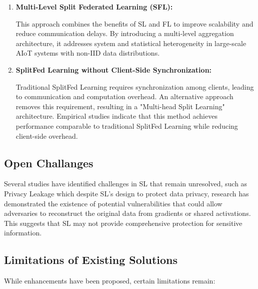 \begin{enumerate}

	\item \textbf{Multi-Level Split Federated Learning (\gls{SFL}):} 
	
	This approach combines the benefits of \gls{SL} and \gls{FL} to improve scalability and reduce communication delays. By introducing a multi-level aggregation architecture, it addresses system and statistical heterogeneity in large-scale AIoT systems with non-IID data distributions.
	
	\item \textbf{SplitFed Learning without Client-Side Synchronization:}
	 
	Traditional SplitFed Learning requires synchronization among clients, leading to communication and computation overhead. An alternative approach removes this requirement, resulting in a "Multi-head Split Learning" architecture. Empirical studies indicate that this method achieves performance comparable to traditional SplitFed Learning while reducing client-side overhead. 

\end{enumerate}

\subsection{Open Challanges}
\label{sec:sl_open_challenges}

Several studies have identified challenges in SL that remain unresolved, such as Privacy Leakage which despite \gls{SL}'s design to protect data privacy, research has demonstrated the existence of potential vulnerabilities that could allow adversaries to reconstruct the original data from gradients or shared activations. This suggests that \gls{SL} may not provide comprehensive protection for sensitive information.

\subsection{Limitations of Existing Solutions}
\label{sec:limitations_on_existing_solutions}

While enhancements have been proposed, certain limitations remain:

